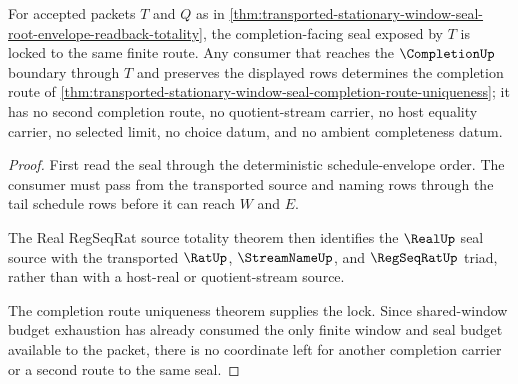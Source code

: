\begin{theorem}
\label{thm:transported-stationary-window-seal-completion-seal-lock}
For accepted packets $T$ and $Q$ as in \autoref{thm:transported-stationary-window-seal-root-envelope-readback-totality}, the completion-facing seal exposed by $T$ is locked to the same finite route. Any consumer that reaches the $\CompletionUp$ boundary through $T$ and preserves the displayed rows determines the completion route of \autoref{thm:transported-stationary-window-seal-completion-route-uniqueness}; it has no second completion route, no quotient-stream carrier, no host equality carrier, no selected limit, no choice datum, and no ambient completeness datum.
\end{theorem}
\begin{proof}
First read the seal through the deterministic schedule-envelope order. The consumer must pass from the transported source and naming rows through the tail schedule rows before it can reach $W$ and $E$.

The Real RegSeqRat source totality theorem then identifies the $\RealUp$ seal source with the transported $\RatUp$, $\StreamNameUp$, and $\RegSeqRatUp$ triad, rather than with a host-real or quotient-stream source.

The completion route uniqueness theorem supplies the lock. Since shared-window budget exhaustion has already consumed the only finite window and seal budget available to the packet, there is no coordinate left for another completion carrier or a second route to the same seal.
\end{proof}

